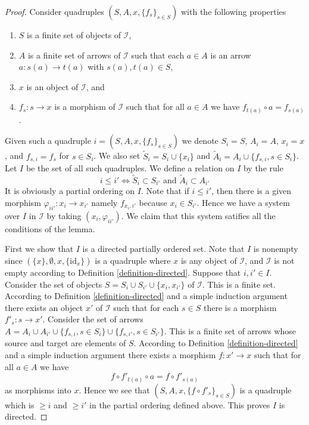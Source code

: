 \begin{proof}
Consider quadruples $(S, A, x, \{f_s\}_{s \in S})$ with the
following properties
\begin{enumerate}
\item $S$ is a finite set of objects of $\mathcal{I}$,
\item $A$ is a finite set of arrows of $\mathcal{I}$ such that
each $a \in A$ is an arrow $a : s(a) \to t(a)$ with $s(a), t(a) \in S$,
\item $x$ is an object of $\mathcal{I}$, and
\item $f_s : s \to x$ is a morphism of $\mathcal{I}$ such that
for all $a \in A$ we have $f_{t(a)} \circ a = f_{s(a)}$.
\end{enumerate}
Given such a quadruple $i = (S, A, x, \{f_s\}_{s \in S})$
we denote $S_i = S$, $A_i = A$, $x_i = x$, and $f_{s, i} = f_s$
for $s \in S_i$. We also set
$\tilde S_i = S_i \cup \{x_i\}$ and
$\tilde A_i = A_i \cup \{f_{s, i}, s \in S_i\}$.
Let $I$ be the set of all such quadruples.
We define a relation on $I$ by the rule
$$
i \leq i' \Leftrightarrow 
\tilde S_i \subset S_{i'} \text{ and } \tilde A_i \subset A_{i'}
$$
It is obviously a partial ordering on $I$. Note that if $i \leq i'$,
then there is a given morphism $\varphi_{ii'} : x_i \to x_{i'}$
namely $f_{x_i, i'}$ because $x_i \in S_{i'}$.
Hence we have a system over $I$ in $\mathcal{I}$ by taking
$(x_i, \varphi_{ii'})$. We claim that this system satifies all
the conditions of the lemma.

\medskip\noindent
First we show that $I$ is a directed partially ordered set.
Note that $I$ is nonempty since $(\{x\}, \emptyset, x, \{\text{id}_x\})$
is a quadruple where $x$ is any object of $\mathcal{I}$, and
$\mathcal{I}$ is not empty according to
Definition \ref{definition-directed}.
Suppose that $i, i' \in I$. Consider the set of objects
$S = S_i \cup S_{i'} \cup \{x_i, x_{i'}\}$ of $\mathcal{I}$.
This is a finite set. According to Definition \ref{definition-directed}
and a simple induction argument there exists an object $x'$ of
$\mathcal{I}$ such that for each $s \in S$ there is a morphism
$f'_s : s \to x'$. Consider the set of arrows
$A = A_i \cup A_{i'} \cup \{f_{s, i}, s \in S_i\}
\cup \{f_{s, i'}, s \in S_{i'}\}$. This is a finite set of
arrows whose source and target are elements of $S$.
According to Definition \ref{definition-directed}
and a simple induction argument there exists a morphism
$f : x' \to x$ such that for all $a \in A$ we have
$$
f \circ f'_{t(a)} \circ a = f \circ f'_{s(a)}
$$
as morphisms into $x$. Hence we see that
$(S, A, x, \{f \circ f'_s\}_{s \in S})$ is a quadruple which is
$\geq i$ and $\geq i'$ in the partial ordering defined above.
This proves $I$ is directed.


\end{proof}

